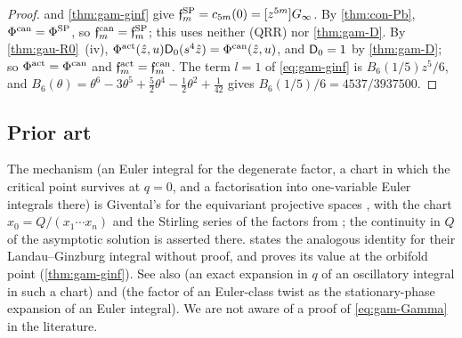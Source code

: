 \begin{proof}
 and \cref{thm:gam-ginf} give $\mathfrak{f}^{\mathrm{SP}}_m=c_{5m}(0)=[z^{5m}]G_{\infty}$. By \cref{thm:con-Pb}, $\Phi^{\mathrm{can}}=\Phi^{\mathrm{SP}}$, so $\mathfrak{f}^{\mathrm{can}}_m=\mathfrak{f}^{\mathrm{SP}}_m$; this uses neither (QRR) nor \cref{thm:gam-D}. By \cref{thm:gau-R0}~(iv), $\Phi^{\mathrm{act}}(\hat{z},u)\mathsf{D}_0(s^4\hat{z})=\Phi^{\mathrm{can}}(\hat{z},u)$, and $\mathsf{D}_0=1$ by \cref{thm:gam-D}; so $\Phi^{\mathrm{act}}=\Phi^{\mathrm{can}}$ and $\mathfrak{f}^{\mathrm{act}}_m=\mathfrak{f}^{\mathrm{can}}_m$. The term $l=1$ of \eqref{eq:gam-ginf} is $B_6(1/5)z^5/6$, and $B_6(\theta)=\theta^6-3\theta^5+\tfrac52\theta^4-\tfrac12\theta^2+\tfrac1{42}$ gives $B_6(1/5)/6=4537/3937500$.
\end{proof}

\subsection{Prior art}
\label{sec:gam-rmk}

\begin{rmk}
\label{rmk:gam-prior}
The mechanism (an Euler integral for the degenerate factor, a chart in which the critical point survives at $q=0$, and a factorisation into one-variable Euler integrals there) is Givental's for the equivariant projective spaces \cite[\S10]{MR1901075}, with the chart $x_0=Q/(x_1\cdots x_n)$ and the Stirling series of the factors from \cite[10.4~Lemma]{MR1901075}; the continuity in $Q$ of the asymptotic solution is asserted there.  \cite[Remark~7.2]{GJR18} states the analogous identity for their Landau--Ginzburg integral without proof, and \cite[Lemma~7.7, (37)]{GJR18} proves its value at the orbifold point (\cref{thm:gam-ginf}). See also \cite[Lemma~4.20]{MR2553377} (an exact expansion in $q$ of an oscillatory integral in such a chart) and \cite[\S7, (11)]{MR2276766} (the factor of an Euler-class twist as the stationary-phase expansion of an Euler integral). We are not aware of a proof of \eqref{eq:gam-Gamma} in the literature.
\end{rmk}
